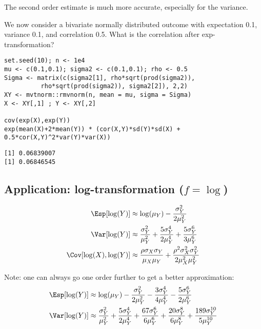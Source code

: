 \documentclass[12pt]{article}
\begin{document}
The second order estimate is much more accurate, especially for the
variance.

\bigskip

We now consider a bivariate normally distributed outcome with
expectation 0.1, variance 0.1, and correlation 0.5. What is the
correlation after exp-transformation?
\lstset{language=r,label= ,caption= ,captionpos=b,numbers=none}
\begin{lstlisting}
set.seed(10); n <- 1e4
mu <- c(0.1,0.1); sigma2 <- c(0.1,0.1); rho <- 0.5
Sigma <- matrix(c(sigma2[1], rho*sqrt(prod(sigma2)),
		  rho*sqrt(prod(sigma2)), sigma2[2]), 2,2)
XY <- mvtnorm::rmvnorm(n, mean = mu, sigma = Sigma)
X <- XY[,1] ; Y <- XY[,2]

cov(exp(X),exp(Y))
exp(mean(X)+2*mean(Y)) * (cor(X,Y)*sd(Y)*sd(X) + 0.5*cor(X,Y)^2*var(Y)*var(X))
\end{lstlisting}

\begin{verbatim}
[1] 0.06839007
[1] 0.06846545
\end{verbatim}


\clearpage

\subsection{Application:  log-transformation (\(f = \log\))}
\label{sec:org02bbf8f}

\begin{align*}
\Esp[\log(Y)] &\approx \log(\mu_Y) - \frac{\sigma_Y^2}{2\mu_Y^2} \\
\Var[\log(Y)] &\approx \frac{\sigma^2_Y}{\mu_Y^2} + \frac{5 \sigma^4_Y}{2\mu_Y^4} + \frac{5 \sigma^6_Y}{3\mu_Y^6} \\
\Cov[\log(X),\log(Y)] &\approx \frac{\rho \sigma_X \sigma_Y}{\mu_X\mu_Y} + \frac{\rho^2 \sigma^2_X \sigma^2_Y}{2\mu_X^2\mu_Y^2}
\end{align*}

Note: one can always go one order further to get a better approximation:
\begin{align*}
\Esp[\log(Y)] &\approx \log(\mu_Y) - \frac{\sigma_Y^2}{2\mu_Y^2} - \frac{3\sigma_Y^4}{4\mu_Y^4}  - \frac{5\sigma_Y^6}{2\mu_Y^6}  \\
\Var[\log(Y)] &\approx \frac{\sigma^2_Y}{\mu_Y^2} + \frac{5 \sigma^4_Y}{2\mu_Y^4} + \frac{67 \sigma^6_Y}{6\mu_Y^6} + \frac{20\sigma^8_Y}{6\mu_Y^8} + \frac{189\sigma^{10}_Y}{5\mu_Y^{10}} \\
\end{align*}
\end{document}
